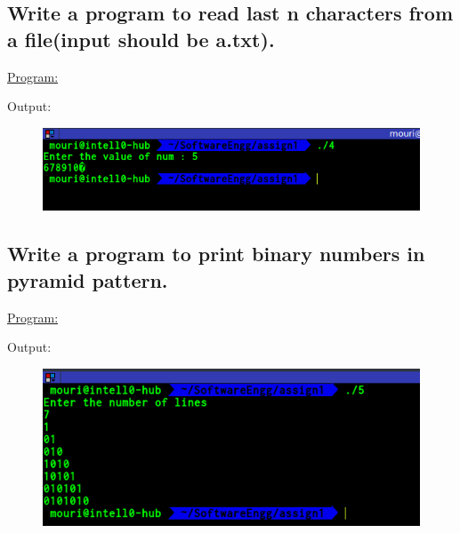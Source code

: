 \documentclass[a4paper,11pt]{article}
\begin{document}
\subsection{Write a program to read last n characters from a file(input should be a.txt).}
\underline{Program:}



Output:
\begin{figure}[H]
\centering
\includegraphics[width=350pt,height=\textheight,keepaspectratio]{./pics/4.png}
\end{figure}
\bigskip

\subsection{Write a program to print binary numbers in pyramid pattern.}
\underline{Program:}

Output:
\begin{figure}[H]
\centering
\includegraphics[width=350pt,height=\textheight,keepaspectratio]{./pics/5.png}
\end{figure}
\bigskip

\end{document}
